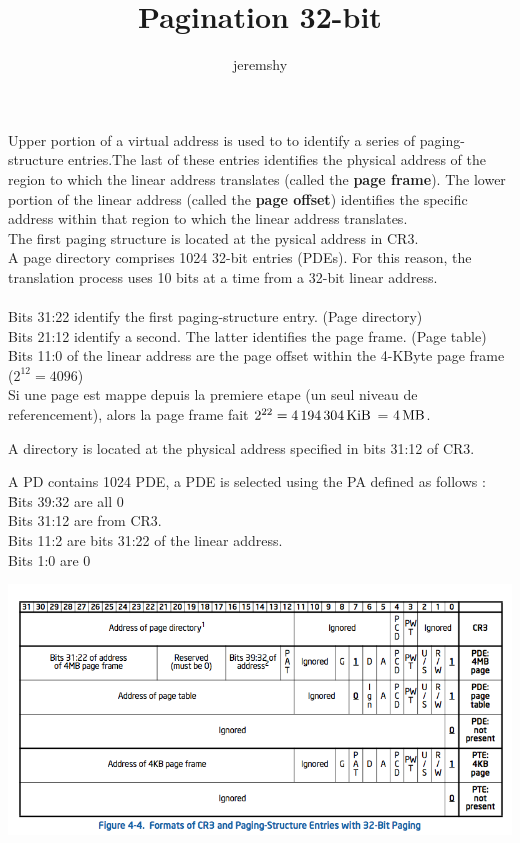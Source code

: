 \documentclass{article}
\begin{document}
\title{Pagination 32-bit}
\author{jeremshy}
\maketitle

Upper portion of a virtual address is used to to identify a series of paging-structure entries.The last of these entries identifies the physical address of the region to which the linear address translates (called the \textbf{page frame}). The lower portion of the linear 	address (called the \textbf{page offset}) identifies the specific address within that region to which the linear address translates.\\

The first paging structure is located at the pysical address in CR3. \\
A page directory comprises 1024 32-bit entries (PDEs). For this reason, the translation process uses 10 bits at a time from a 32-bit linear address.\\
\\

\noindent
Bits 31:22 identify the first paging-structure entry. (Page directory)\\
Bits 21:12 identify a second. The latter identifies the page frame. (Page table)\\
Bits 11:0 of the linear address are the page offset within the 4-KByte page frame ($2^{12} = 4096$)\\

Si une page est mappe depuis la premiere etape (un seul niveau de referencement), alors la page frame fait $2^{22} = \SI{4194304}{\kibi\byte}$ = $\SI{4}{\mega\byte}$.

A directory is located at the physical address specified in bits 31:12 of CR3.\\

\begin{tabbing}
A PD contains 1024 PDE, a PDE is selected using the PA defined as follows :\\
\hspace{1cm}\=Bits 39:32 are all 0\\
\>Bits 31:12 are from CR3.\\
\>Bits 11:2 are bits 31:22 of the linear address.\\
\>Bits 1:0 are 0\\ 
\end{tabbing}

\flushleft\includegraphics[scale=0.59]{cr3_graph.png}
\end{document}
